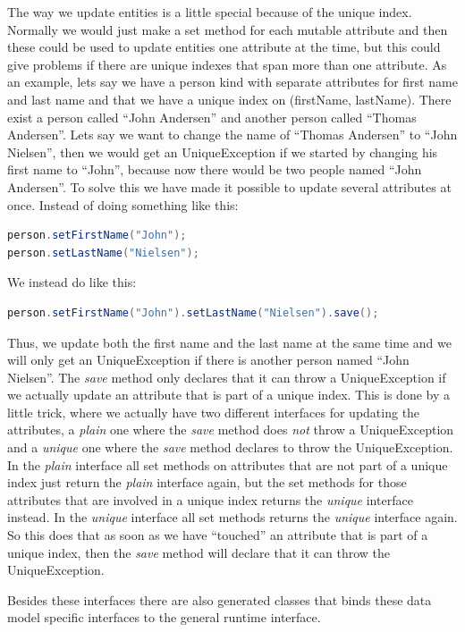 The way we update entities is a little special because of the unique
index. Normally we would just make a set method for each mutable attribute
and then these could be used to update entities one attribute at the
time, but this could give problems if there are unique indexes that
span more than one attribute. As an example, lets say we have a person
kind with separate attributes for first name and last name and that
we have a unique index on (firstName, lastName). There exist a person
called ``John Andersen'' and another person called ``Thomas Andersen''.
Lets say we want to change the name of ``Thomas Andersen'' to ``John
Nielsen'', then we would get an UniqueException if we started by
changing his first name to ``John'', because now there would be
two people named ``John Andersen''. To solve this we have made it
possible to update several attributes at once. Instead of doing something
like this:\begin{lstlisting}[language=java,frame=l]
person.setFirstName("John");
person.setLastName("Nielsen");
\end{lstlisting}We instead do like this:\begin{lstlisting}[language=java,frame=l]
person.setFirstName("John").setLastName("Nielsen").save();
\end{lstlisting}Thus, we update both the first name and the last name at the same
time and we will only get an UniqueException if there is another person
named ``John Nielsen''. The \emph{save} method only declares that
it can throw a UniqueException if we actually update an attribute
that is part of a unique index. This is done by a little trick, where
we actually have two different interfaces for updating the attributes,
a \emph{plain} one where the \emph{save} method does \emph{not} throw
a UniqueException and a \emph{unique} one where the \emph{save} method
declares to throw the UniqueException. In the \emph{plain} interface
all set methods on attributes that are not part of a unique index
just return the \emph{plain} interface again, but the set methods
for those attributes that are involved in a unique index returns the
\emph{unique} interface instead. In the \emph{unique} interface all
set methods returns the \emph{unique} interface again. So this does
that as soon as we have ``touched'' an attribute that is part of
a unique index, then the \emph{save} method will declare that it can
throw the UniqueException.

Besides these interfaces there are also generated classes that binds
these data model specific interfaces to the general runtime interface.


